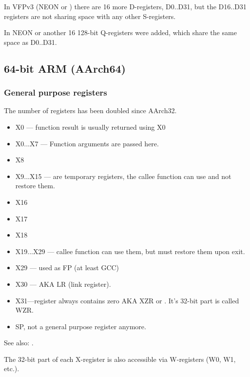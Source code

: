 In VFPv3 (\gls{NEON} or ) there are 16 more D-registers, D0..D31, but the D16..D31 registers are not sharing space with any other S-registers.

In \gls{NEON} or  another 16 128-bit Q-registers were added, which share the same space as D0..D31.

\subsection{64-bit ARM (AArch64)}

\subsubsection{General purpose registers}
\label{ARM64_GPRs}

The number of registers has been doubled since AArch32.

\begin{itemize}
	\item X0 --- function result is usually returned using X0
        \item X0...X7 --- Function arguments are passed here.
	\item X8
	\item X9...X15 --- are temporary registers, the callee function can use and not restore them.
	\item X16
	\item X17
	\item X18
	\item X19...X29 --- callee function can use them, but must restore them upon exit.
	\item X29 --- used as \ac{FP} (at least GCC)
	\item X30 ---  \ac{AKA} \ac{LR} (\gls{link register}).
	\item X31---register always contains zero \ac{AKA} XZR or . It's 32-bit part is called WZR.
	\item \ac{SP}, not a general purpose register anymore.
\end{itemize}

See also: \ARMPCS.

The 32-bit part of each X-register is also accessible via W-registers (W0, W1, etc.).


